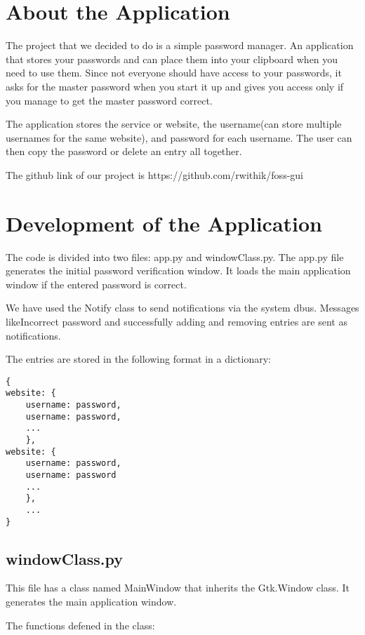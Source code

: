 \documentclass[draft,10pt,a4paper,titlepage]{report}
\begin{document}
\chapter{About the Application}
\newline\par The project that we decided to do is a simple password manager. An application that stores your passwords and can place them into your clipboard when you need to use them. Since not everyone should have access to your passwords, it asks for the master password when you start it up and gives you access only if you manage to get the master password correct. 
\newline\par The application stores the service or website, the username(can store multiple usernames for the same website), and password for each username. The user can then copy the password or delete an entry all together. 
\newline\par The github link of our project is https://github.com/rwithik/foss-gui

\chapter{Development of the Application}
\newline\par The code is divided into two files: app.py and windowClass.py. The app.py file generates the initial password verification window. It loads the main application window if the entered password is correct. 
\newline\par We have used the Notify class to send notifications via the system dbus. Messages likeIncorrect password and successfully adding and removing entries are sent as notifications. 
\newline\par The entries are stored in the following format in a dictionary:
\begin{verbatim}
{
website: {
	username: password, 
	username: password, 
	...
	}, 
website: {
	username: password, 
	username: password
	...
	}, 
	...
}
\end{verbatim}

\section{windowClass.py}
\newline\par This file has a class named MainWindow that inherits the Gtk.Window class. It generates the main application window.
\newline\par The functions defened in the class:
\end{document}
